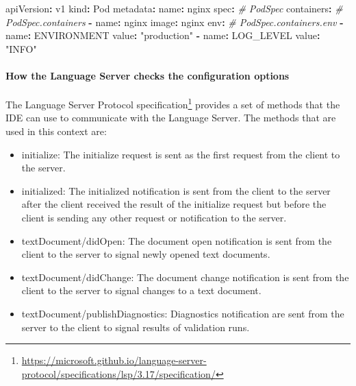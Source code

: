 \documentclass[
  11pt,
]{article}
\newenvironment{Shaded}{}{}
\newcommand{\AttributeTok}[1]{\textcolor[rgb]{0.49,0.56,0.16}{#1}}
\newcommand{\CommentTok}[1]{\textcolor[rgb]{0.38,0.63,0.69}{\textit{#1}}}
\newcommand{\FunctionTok}[1]{\textcolor[rgb]{0.02,0.16,0.49}{#1}}
\newcommand{\KeywordTok}[1]{\textcolor[rgb]{0.00,0.44,0.13}{\textbf{#1}}}
\newcommand{\StringTok}[1]{\textcolor[rgb]{0.25,0.44,0.63}{#1}}
\DeclareRobustCommand{\href}[2]{#2\footnote{\url{#1}}}
\begin{document}
\begin{Shaded}
\begin{Highlighting}[]
\FunctionTok{apiVersion}\KeywordTok{:}\AttributeTok{ v1}
\FunctionTok{kind}\KeywordTok{:}\AttributeTok{ Pod}
\FunctionTok{metadata}\KeywordTok{:}
\AttributeTok{  }\FunctionTok{name}\KeywordTok{:}\AttributeTok{ nginx}
\FunctionTok{spec}\KeywordTok{:}\CommentTok{  \# PodSpec}
\AttributeTok{  }\FunctionTok{containers}\KeywordTok{:}\CommentTok{ \# PodSpec.containers}
\AttributeTok{  }\KeywordTok{{-}}\AttributeTok{ }\FunctionTok{name}\KeywordTok{:}\AttributeTok{ nginx}
\AttributeTok{    }\FunctionTok{image}\KeywordTok{:}\AttributeTok{ nginx}
\AttributeTok{    }\FunctionTok{env}\KeywordTok{:}\CommentTok{ \# PodSpec.containers.env}
\AttributeTok{    }\KeywordTok{{-}}\AttributeTok{ }\FunctionTok{name}\KeywordTok{:}\AttributeTok{ ENVIRONMENT }
\AttributeTok{      }\FunctionTok{value}\KeywordTok{:}\AttributeTok{ }\StringTok{"production"}
\AttributeTok{    }\KeywordTok{{-}}\AttributeTok{ }\FunctionTok{name}\KeywordTok{:}\AttributeTok{ LOG\_LEVEL}
\AttributeTok{      }\FunctionTok{value}\KeywordTok{:}\AttributeTok{ }\StringTok{"INFO"}
\end{Highlighting}
\end{Shaded}

\hypertarget{how-the-language-server-checks-the-configuration-options}{%
\paragraph{How the Language Server checks the configuration
options}\label{how-the-language-server-checks-the-configuration-options}}

The
\href{https://microsoft.github.io/language-server-protocol/specifications/lsp/3.17/specification/}{Language
Server Protocol specification} provides a set of methods that the IDE
can use to communicate with the Language Server. The methods that are
used in this context are:

\begin{itemize}
\item
  initialize: The initialize request is sent as the first request from
  the client to the server.
\item
  initialized: The initialized notification is sent from the client to
  the server after the client received the result of the initialize
  request but before the client is sending any other request or
  notification to the server.
\item
  textDocument/didOpen: The document open notification is sent from the
  client to the server to signal newly opened text documents.
\item
  textDocument/didChange: The document change notification is sent from
  the client to the server to signal changes to a text document.
\item
  textDocument/publishDiagnostics: Diagnostics notification are sent
  from the server to the client to signal results of validation runs.
\end{itemize}
\end{document}
